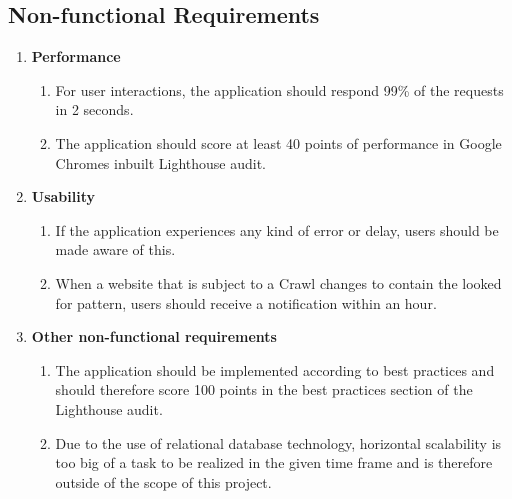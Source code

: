 \documentclass[titlepage, 12pt]{article}
\begin{document}
\subsection{Non-functional Requirements}

\begin{enumerate}
  \item \textbf{Performance}
        \begin{enumerate}
          \item For user interactions, the application should respond 99\% of the requests in 2 seconds.
          \item The application should score at least 40 points of performance in Google Chromes inbuilt Lighthouse audit.
        \end{enumerate}
  \item \textbf{Usability}
        \begin{enumerate}
          \item If the application experiences any kind of error or delay, users should be made aware of this.
          \item When a website that is subject to a Crawl changes to contain the looked for pattern, users should receive a notification within an hour.
        \end{enumerate}
  \item \textbf{Other non-functional requirements}
        \begin{enumerate}
          \item The application should be implemented according to best practices and should therefore score 100 points in the best practices section of the Lighthouse audit.
          \item Due to the use of relational database technology, horizontal scalability is too big of a task to be realized in the given time frame and is therefore outside of the scope of this project.
        \end{enumerate}
\end{enumerate}

\pagebreak

\listoftables

\pagebreak



\end{document}
